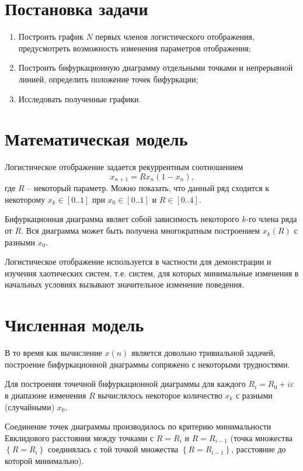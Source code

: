 \section{Постановка задачи}

\begin{enumerate}
\item Построить график $N$ первых членов логистического отображения, предусмотреть возможность изменения параметров отображения;
\item Построить бифуркационную диаграмму отдельными точками и непрерывной линией, определить положение точек бифуркации;
\item Исследовать полученные графики.
\end{enumerate}

\section{Математическая модель}

Логистическое отображение задается рекуррентным соотношением
\begin{equation}
x_{n+1} = R x_n \left(1 - x_n\right) \textrm{,}
\end{equation}
где $R$ -- некоторый параметр. Можно показать, что данный ряд сходится к некоторому $x_k \in \left[0..1\right]$ при $x_0 \in \left[0..1\right]$ и $R \in \left[0..4\right]$.

Бифуркационная диаграмма являет собой зависимость некоторого $k$-го члена ряда от $R$. Вся диаграмма может быть получена многократным построением $x_k(R)$ с разными $x_0$.

Логистическое отображение используется в частности для демонстрации и изучения хаотических систем, т.е. систем, для которых минимальные изменения в начальных условиях вызывают значительное изменение поведения.

\section{Численная модель}

В то время как вычисление $x(n)$ является довольно тривиальной задачей, построение бифуркационной диаграммы сопряжено с некоторыми трудностями.

Для построения точечной бифуркационной диаграммы для каждого $R_i = R_0 + i\varepsilon$ в диапазоне изменения $R$ вычислялось некоторое количество $x_k$ с разными (случайными) $x_0$.

Соединение точек диаграммы производилось по критерию минимальности Евклидового расстояния между точками с $R = R_{i}$ и $R = R_{i - 1}$ (точка множества $\left\{R = R_{i}\right\}$ соединялась с той точкой множества $\left\{R = R_{i - 1}\right\}$, расстояние до которой минимально).

